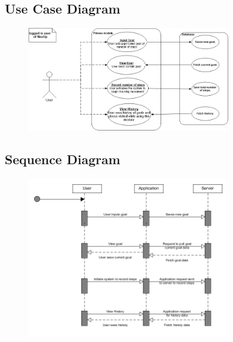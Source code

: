 \subsection{Use Case Diagram}
\begin{figure}[H]
  \includegraphics[width=0.8\textwidth]{Fitness/FitnessUseCase.png}
\end{figure}


\subsection{Sequence Diagram}
\begin{figure}[H]
  \includegraphics[width=0.8\textwidth]{Fitness/FitnessSequenceDgm.png}
\end{figure}



